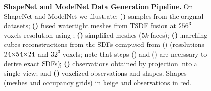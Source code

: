 \begin{figure}[ht]
\begin{subfigure}[t]{0.32\textwidth}
\begin{subfigure}[t]{0.32\textwidth}
   		\end{subfigure}
		\label{fig:data-shapenet-modelnet-f}
	\end{subfigure}
    \vspace*{-\figskipcaption px}
	\caption{{\bf ShapeNet and ModelNet Data Generation Pipeline.} On ShapeNet and ModelNet we illustrate: {\bf ()} samples from the original datasets; {\bf ()} fused watertight meshes from TSDF fusion at $256^3$ voxels resolution using \citep{Riegler2017THREEDV}; {\bf ()} simplified meshes ($5k$ faces); {\bf ()} marching cubes \citep{Lorensen1987SIGGRAPH} reconstructions from the SDFs computed from () (resolutions $24 \operatorname*{\!\times\!} 54 \operatorname*{\!\times\!} 24$ and $32^3$ voxels; note that steps () and () are necessary to derive exact SDFs); {\bf ()} observations obtained by projection into a single view; and {\bf ()} voxelized observations and shapes. Shapes (meshes and occupancy grids) {in \color{rbeige}beige} and observations in {\color{rred}red}.}
	\label{fig:data-shapenet-modelnet}
    \vspace*{-\figskipbelow px}
\end{figure}